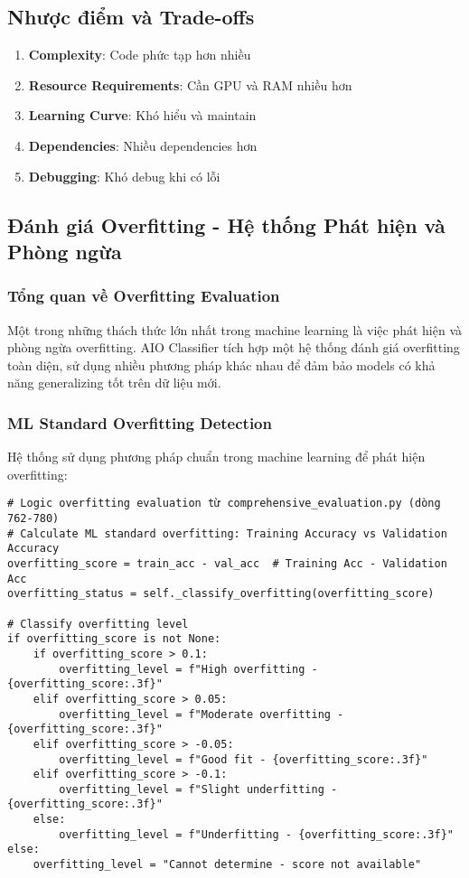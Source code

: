 \subsection{Nhược điểm và Trade-offs}

\begin{enumerate}
    \item \textbf{Complexity}: Code phức tạp hơn nhiều
    \item \textbf{Resource Requirements}: Cần GPU và RAM nhiều hơn
    \item \textbf{Learning Curve}: Khó hiểu và maintain
    \item \textbf{Dependencies}: Nhiều dependencies hơn
    \item \textbf{Debugging}: Khó debug khi có lỗi
\end{enumerate}

\subsection{Đánh giá Overfitting - Hệ thống Phát hiện và Phòng ngừa}

\subsubsection{Tổng quan về Overfitting Evaluation}

Một trong những thách thức lớn nhất trong machine learning là việc phát hiện và phòng ngừa overfitting. AIO Classifier tích hợp một hệ thống đánh giá overfitting toàn diện, sử dụng nhiều phương pháp khác nhau để đảm bảo models có khả năng generalizing tốt trên dữ liệu mới.

\subsubsection{ML Standard Overfitting Detection}

Hệ thống sử dụng phương pháp chuẩn trong machine learning để phát hiện overfitting:

\begin{verbatim}
# Logic overfitting evaluation từ comprehensive_evaluation.py (dòng 762-780)
# Calculate ML standard overfitting: Training Accuracy vs Validation Accuracy
overfitting_score = train_acc - val_acc  # Training Acc - Validation Acc
overfitting_status = self._classify_overfitting(overfitting_score)

# Classify overfitting level
if overfitting_score is not None:
    if overfitting_score > 0.1:
        overfitting_level = f"High overfitting - {overfitting_score:.3f}"
    elif overfitting_score > 0.05:
        overfitting_level = f"Moderate overfitting - {overfitting_score:.3f}"
    elif overfitting_score > -0.05:
        overfitting_level = f"Good fit - {overfitting_score:.3f}"
    elif overfitting_score > -0.1:
        overfitting_level = f"Slight underfitting - {overfitting_score:.3f}"
    else:
        overfitting_level = f"Underfitting - {overfitting_score:.3f}"
else:
    overfitting_level = "Cannot determine - score not available"
\end{verbatim}

